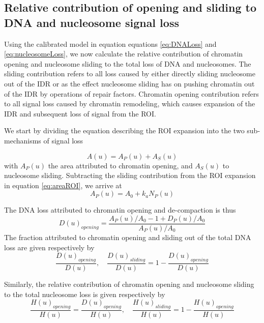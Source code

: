 \documentclass[12pt]{article}
\begin{document}
\subsection{Relative contribution of opening and sliding to DNA and nucleosome signal loss}

Using the calibrated model in equation equations \eqref{eq:DNALoss}  and \eqref{eq:nucleosomeLoss}, we now calculate the
relative contribution of chromatin opening and nucleosome sliding to the
total loss of DNA and nucleosomes. The sliding contribution refers to all loss
caused by either directly sliding nucleosome out of the IDR or as the effect
nucleosome sliding has on pushing chromatin out of the IDR by operations
of repair factors. Chromatin opening contribution refers to all signal loss
caused by chromatin remodeling, which causes expansion of the IDR and
subsequent loss of signal from the ROI.

We start by dividing the equation describing the ROI expansion into the
two sub-mechanisms of signal loss

\begin{equation*}
A(u) = A_P(u) +A_S(u)
\end{equation*}
with $A_P(u)$ the area attributed to chromatin opening, and $A_S(u)$ to nucleosome sliding. Subtracting the sliding contribution from the ROI expansion
in equation \eqref{eq:areaROI}, we arrive at
\begin{equation*}
A_P(u) = A_0 + k_aN_P(u)
\end{equation*}

The DNA loss attributed to chromatin opening and de-compaction is thus
\begin{equation*}
D(u)_{opening}= \frac{A_P(u)/A_0 -1 +D_P(u)/A_0}{A_P(u)/A_0}
\end{equation*}	
The fraction attributed to chromatin opening and sliding out of the total
DNA loss are given respectively by
\begin{equation}\label{eq:relativeOpeningSlidingDNA}
\frac{D(u)_{opening}}{D(u)}, \quad \frac{D(u)_{sliding}}{D(u)}=1-\frac{D(u)_{opening}}{D(u)}
\end{equation}

Similarly, the relative contribution of chromatin opening and nucleosome
sliding to the total nucleosome loss is given respectively by
\begin{equation}\label{eq:relativeOpeningSlidingNucleosomes}
\frac{H(u)_{opening}}{H(u)} = \frac{D(u)_{opening}}{H(u)},\quad \frac{H(u)_{sliding}}{H(u)}=1-\frac{H(u)_{opening}}{H(u)}
\end{equation}
\end{document}

